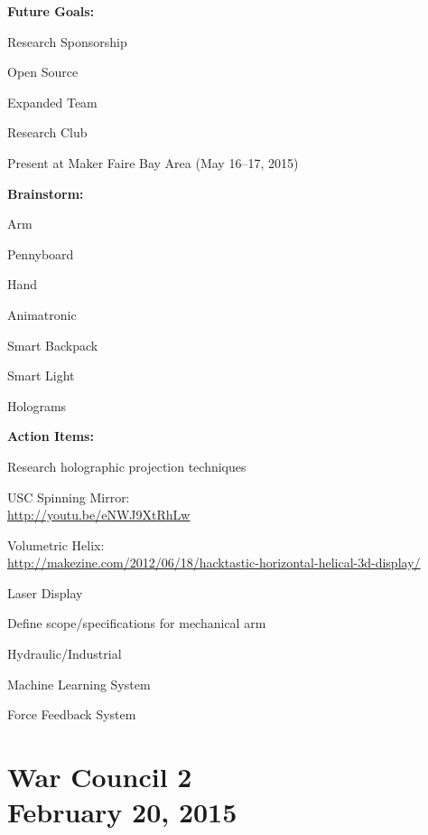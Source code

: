 \documentclass[11pt]{article}
\begin{document}
\noindent \textbf{Future Goals:}
	\begin{compactitem}
	\item Research Sponsorship
	\item Open Source
	\item Expanded Team
	\item Research Club
	\item Present at Maker Faire Bay Area (May 16--17, 2015)
	\end{compactitem}

\noindent \textbf{Brainstorm:}
	\begin{compactitem}
	\item Arm
	\item Pennyboard
	\item Hand 
	\item Animatronic
	\item Smart Backpack
	\item Smart Light
	\item Holograms
	\end{compactitem}

\noindent \textbf{Action Items:}
	\begin{compactitem}
	\item Research holographic projection techniques
		\begin{compactitem}
		\item USC Spinning Mirror: \\ \url{http://youtu.be/eNWJ9XtRhLw}
		\item Volumetric Helix: \\ \url{http://makezine.com/2012/06/18/hacktastic-horizontal-helical-3d-display/}
		\item Laser Display
		\end{compactitem}
	\item Define scope/specifications for mechanical arm
		\begin{compactitem}
		\item Hydraulic/Industrial
		\item Machine Learning System
		\item Force Feedback System
		\end{compactitem}
	\end{compactitem}


\section{War Council 2 \\ February 20, 2015}
\end{document}
